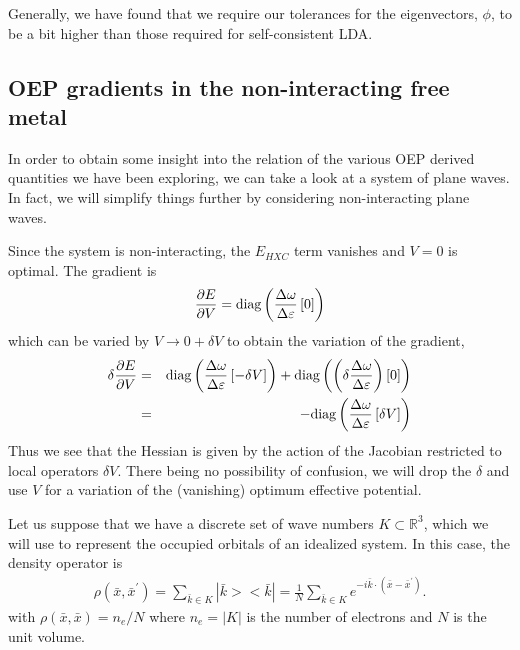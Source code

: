 \documentclass{article}
\newcommand{\beas}{\begin{eqnarray*}}
\newcommand{\enas}{\end{eqnarray*}}
\newcommand{\Vscp}{V}
\newcommand{\reals}{\mathbb{R}}
\begin{document}
Generally, we have found that we require our tolerances for the
eigenvectors, $\phi$, to be a bit higher than those required for
self-consistent LDA.

\subsection{OEP gradients in the non-interacting free metal}

In order to obtain some insight into the relation of the various
OEP derived quantities we have been exploring, we can take a look at a
system of plane waves.  In fact, we will simplify things further by
considering non-interacting plane waves.

Since the system is non-interacting, the $E_{HXC}$ term vanishes
and $\Vscp = 0$ is optimal.  The gradient is
\beas
  \frac{\partial E}{\partial \Vscp} = 
\diag\left(\frac{\Delta \omega}{\Delta \varepsilon}\left[ 0 \right]\right)
\enas
which can be varied by $\Vscp \rightarrow 0 + \delta V$ to obtain
the variation of the gradient,
\beas
\delta \frac{\partial E}{\partial \Vscp} &=& 
\diag\left(\frac{\Delta \omega}{\Delta \varepsilon}\left[ -\delta V \right]\right)
+\diag\left(\left(\delta \frac{\Delta \omega}{\Delta \varepsilon}\right)\left[ 0 \right]\right)
\\
&=&
-\diag\left(\frac{\Delta \omega}{\Delta \varepsilon}\left[ \delta V \right]\right)
\enas
Thus we see that the Hessian is given by the action of the Jacobian
restricted to local operators $\delta V$.  There being no possibility
of confusion, we will drop the $\delta$ and use $V$ for a variation of
the (vanishing) optimum effective potential.

Let us suppose that we have a discrete set of wave numbers $K \subset
\reals^3$, which we will use to represent the occupied orbitals of an
idealized system.  In this case, the density operator is
\beas
\rho(\bar{x},\bar{x}^\prime)
= \sum_{\bar{k} \in K} |\bar{k}><\bar{k}|
= \frac{1}{N} \sum_{\bar{k}\in K} e^{-i\bar{k} \cdot(\bar{x}-\bar{x}^\prime)}.
\enas
with $\rho(\bar{x},\bar{x}) = n_e/N$ where $n_e = |K|$ is the number of
electrons and $N$ is the unit volume.
\end{document}
